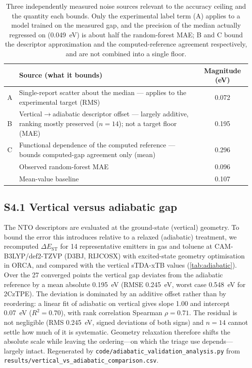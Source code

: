\documentclass[twoside,twocolumn,9pt]{extarticle}
\begin{document}
\begin{table}[htbp]
  \centering
  \caption{Three independently measured noise sources relevant to the accuracy ceiling and
    the quantity each bounds. Only the experimental label term (A) applies to a model
    trained on the measured gap, and the precision of the median actually regressed on
    (\qty{0.049}{\electronvolt}) is about half the random-forest MAE;
    B and C bound the descriptor approximation and the computed-reference agreement
    respectively, and are not combined into a single floor.}
  \label{tab:ceiling}
  \small
  \begin{tabular}{p{}p{}c}
    \toprule
    & Source (what it bounds) & Magnitude (eV) \\
    \midrule
    A & Single-report scatter about the median --- applies to the experimental target (RMS) & 0.072 \\
    B & Vertical$\rightarrow$adiabatic descriptor offset --- largely additive, ranking mostly preserved ($n = 14$); not a target floor (MAE) & 0.195 \\
    C & Functional dependence of the computed reference --- bounds computed-gap agreement only (mean) & 0.296 \\
    \midrule
    & Observed random-forest MAE & 0.096 \\
    & Mean-value baseline & 0.107 \\
    \bottomrule
  \end{tabular}
\end{table}

\subsection*{S4.1 Vertical versus adiabatic gap}
The NTO descriptors are evaluated at the ground-state (vertical) geometry. To bound
the error this introduces relative to a relaxed (adiabatic) treatment, we recomputed
$\Delta E_\text{ST}$ for \num{14} representative emitters in gas and toluene at
CAM-B3LYP/def2-TZVP (D3BJ, RIJCOSX) with excited-state geometry optimisation in
ORCA, and compared with the vertical sTDA-xTB values (\cref{tab:adiabatic}). Over the
\num{27} converged points the vertical gap deviates from the adiabatic reference by a
mean absolute \qty{0.195}{\electronvolt} (RMSE \qty{0.245}{\electronvolt}, worst case
\qty{0.548}{\electronvolt} for 2CzTPE). The deviation is dominated by an additive offset
rather than by reordering: a linear fit of adiabatic on vertical gives slope \num{1.00}
and intercept \qty{0.07}{\electronvolt} ($R^2 = 0.70$), with rank correlation
Spearman $\rho = 0.71$. The residual is not negligible (RMS
\qty{0.245}{\electronvolt}, signed deviations of both signs) and $n = \num{14}$ cannot
settle how much of it is systematic. Geometry relaxation therefore shifts the absolute
scale while leaving the ordering---on which the triage use depends---largely intact.
Regenerated by \texttt{code/adiabatic\_validation\_analysis.py} from
\texttt{results/vertical\_vs\_adiabatic\_comparison.csv}.
\end{document}

